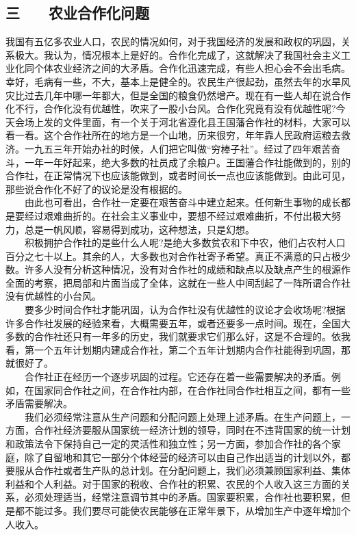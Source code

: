 \documentclass[cn,11pt,chinese]{elegantbook}
\def\myformat#1{\hfil\hfil #1}
\begin{document}
\subsection*{\myformat{三　　农业合作化问题}}
我国有五亿多农业人口，农民的情况如何，对于我国经济的发展和政权的巩固，关系极大。我认为，情况根本上是好的。合作化完成了，这就解决了我国社会主义工业化同个体农业经济之间的大矛盾。合作化迅速完成，有些人担心会不会出毛病。幸好，毛病有一些，不大，基本上是健全的。农民生产很起劲，虽然去年的水旱风灾比过去几年中哪一年都大，但是全国的粮食仍然增产。现在有一些人却在说合作化不行，合作化没有优越性，吹来了一股小台风。合作化究竟有没有优越性呢?今天会场上发的文件里面，有一个关于河北省遵化县王国藩合作社的材料，大家可以看一看。这个合作社所在的地方是一个山地，历来很穷，年年靠人民政府运粮去救济。一九五三年开始办社的时候，人们把它叫做“穷棒子社”。经过了四年艰苦奋斗，一年一年好起来，绝大多数的社员成了余粮户。王国藩合作社能做到的，别的合作社，在正常情况下也应该能做到，或者时间长一点也应该能做到。由此可见，那些说合作化不好了的议论是没有根据的。\\
　　由此也可看出，合作社一定要在艰苦奋斗中建立起来。任何新生事物的成长都是要经过艰难曲折的。在社会主义事业中，要想不经过艰难曲折，不付出极大努力，总是一帆风顺，容易得到成功，这种想法，只是幻想。\\
　　积极拥护合作社的是些什么人呢?是绝大多数贫农和下中农，他们占农村人口百分之七十以上。其余的人，大多数也对合作社寄予希望。真正不满意的只占极少数。许多人没有分析这种情况，没有对合作社的成绩和缺点以及缺点产生的根源作全面的考察，把局部和片面当成了全体，这就在一些人中间刮起了一阵所谓合作社没有优越性的小台风。\\
　　要多少时间合作社才能巩固，认为合作社没有优越性的议论才会收场呢?根据许多合作社发展的经验来看，大概需要五年，或者还要多一点时间。现在，全国大多数的合作社还只有一年多的历史，我们就要求它们那么好，这是不合理的。依我看，第一个五年计划期内建成合作社，第二个五年计划期内合作社能得到巩固，那就很好了。\\
　　合作社正在经历一个逐步巩固的过程。它还存在着一些需要解决的矛盾。例如，在国家同合作社之间，在合作社内部，在合作社同合作社相互之间，都有一些矛盾需要解决。\\
　　我们必须经常注意从生产问题和分配问题上处理上述矛盾。在生产问题上，一方面，合作社经济要服从国家统一经济计划的领导，同时在不违背国家的统一计划和政策法令下保持自己一定的灵活性和独立性；另一方面，参加合作社的各个家庭，除了自留地和其它一部分个体经营的经济可以由自己作出适当的计划以外，都要服从合作社或者生产队的总计划。在分配问题上，我们必须兼顾国家利益、集体利益和个人利益。对于国家的税收、合作社的积累、农民的个人收入这三方面的关系，必须处理适当，经常注意调节其中的矛盾。国家要积累，合作社也要积累，但是都不能过多。我们要尽可能使农民能够在正常年景下，从增加生产中逐年增加个人收入。\\
\end{document}
